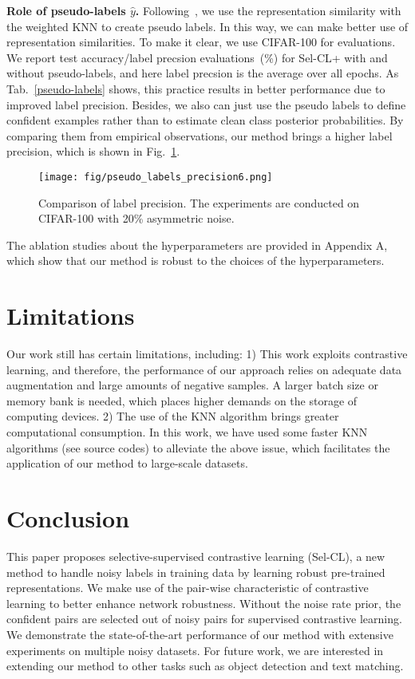 \documentclass[10pt,twocolumn,letterpaper]{article}
\newcommand{\myPara}[1]{\vspace{.05in}\noindent\textbf{#1}}
\begin{document}
\myPara{Role of pseudo-labels $\hat{y}$.} Following~\cite{Ortego2021}, we use the representation similarity with the weighted KNN to create pseudo labels.  In this way, we can make better use of representation similarities. To make it clear, we use CIFAR-100 for evaluations. We report test accuracy/label precsion
evaluations~(\%) for Sel-CL+ with and without pseudo-labels, and here label precsion is the average over all epochs. 
As Tab.~\ref{pseudo-labels} shows, this practice results in better performance due to improved label precision. Besides, we also can just use the pseudo labels to define confident examples rather than to estimate clean class posterior probabilities. By comparing them from empirical observations, our method brings a higher label precision, which is shown in Fig.~\ref{fig:precision}. 

\begin{figure}[ht]
	\centering
	\texttt{[image: fig/pseudo\_labels\_precision6.png]}
	\vspace{-3pt}
	\caption{Comparison of label precision. The experiments are conducted on CIFAR-100 with 20\% asymmetric noise.}
	\vspace{-3pt}
	\label{fig:precision}
\end{figure}

The ablation studies about the hyperparameters are provided in Appendix A, which show that our method is robust to the choices of the hyperparameters.
\vspace{-3pt}
\section{Limitations}
Our work still has certain limitations, including: 
1) This work exploits contrastive learning, and therefore,
the performance of our approach relies on adequate data
augmentation and large amounts of negative samples. A
larger batch size or memory bank is needed, which places
higher demands on the storage of computing devices.
2) The use of the KNN algorithm brings greater computational consumption. In this work, we have used some
faster KNN algorithms (see source codes) to alleviate the
above issue, which facilitates the application of our method
to large-scale datasets.

\vspace{-5pt}
\section{Conclusion}\label{sec:5}
This paper proposes selective-supervised contrastive learning (Sel-CL), a new method to handle noisy labels in training data by learning robust pre-trained representations. We make use of the pair-wise characteristic of contrastive learning to better enhance network robustness. Without the noise rate prior, the confident pairs are selected out of noisy pairs for supervised contrastive learning. We demonstrate the state-of-the-art performance of our method with extensive experiments on multiple noisy datasets. For future work, we are interested in extending our method to other tasks such as object detection and text matching.
\end{document}
